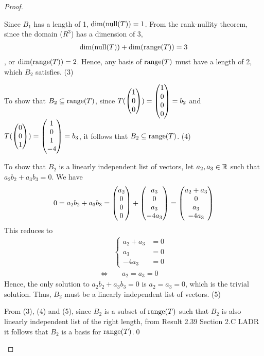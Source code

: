 \begin{proof}
\begin{enumerate}[(i)]
        Since $B_1$ has a length of 1, $\textnormal{dim}(\textnormal{null}(T))=1$. From the rank-nullity theorem, since the domain ($R^3$) has a dimension of 3,
        \[
            \begin{aligned}
                \textnormal{dim}(\textnormal{null}(T))+\textnormal{dim}(\textnormal{range}(T))=3
            \end{aligned}
        \]
        , or $\textnormal{dim}(\textnormal{range}(T))=2$. Hence, any basis of $\textnormal{range}(T)$ must have a length of 2, which $B_2$ satisfies. (3)

        To show that $B_2\subseteq\textnormal{range}(T)$, since $T(\begin{pmatrix} 1\\ 0\\ 0\end{pmatrix})=\begin{pmatrix} 1\\ 0\\0 \\ 0\end{pmatrix}=b_2$ and $T(\begin{pmatrix} 0\\ 0\\ 1\end{pmatrix})=\begin{pmatrix} 1\\ 0\\1 \\ -4\end{pmatrix}=b_3$, it follows that $B_2\subseteq\textnormal{range}(T)$. (4) 

        To show that $B_2$ is a linearly independent list of vectors, let $a_2,a_3\in\mathbb R$ such that $a_2b_2+a_3b_3=0$. We have 
        \[
            \begin{aligned}
                0 = a_2b_2+a_3b_3 = \begin{pmatrix} a_2\\ 0\\0 \\ 0\end{pmatrix}+\begin{pmatrix} a_3\\ 0\\a_3 \\ -4a_3\end{pmatrix}= \begin{pmatrix} a_2+a_3\\ 0\\a_3 \\ -4a_3\end{pmatrix}      
            \end{aligned}
        \]
        This reduces to 
        \begin{align*}
            &\begin{cases}
                a_2+a_3 &= 0\\
                a_3 &= 0\\
                -4a_3 &= 0
            \end{cases}\\
            \iff&\quad \, a_2=a_3=0
        \end{align*}
        Hence, the only solution to $a_2b_2+a_3b_3=0$ is $a_2=a_3=0$, which is the trivial solution. Thus, $B_2$ must be a linearly independent list of vectors. (5)

        From (3), (4) and (5), since $B_2$ is a subset of $\textnormal{range}(T)$ such that $B_2$ is also linearly independent list of the right length, from Result 2.39 Section 2.C LADR it follows that $B_2$ is a basis for $\textnormal{range}(T)$.\qed
    \end{enumerate}
    \renewcommand{\qedsymbol}{}
\end{proof}